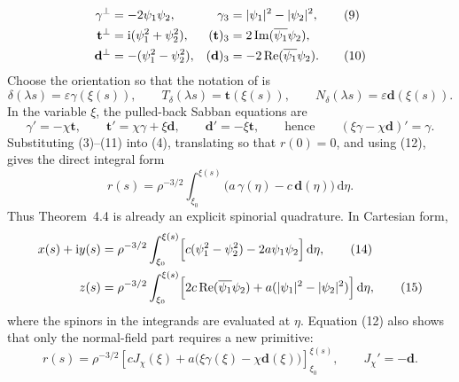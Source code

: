 \documentclass[11pt]{article}
\newcommand{\ii}{\mathrm i}
\newcommand{\dd}{\,\mathrm d}
\newcommand{\Rea}{\operatorname{Re}}
\newcommand{\Ima}{\operatorname{Im}}
\newcommand{\br}[3]{\left[#1\right]_{#2}^{#3}}
\begin{document}
\begin{align}
 \gamma^\perp&=-2\psi_1\psi_2,& \gamma_3&=|\psi_1|^2-|\psi_2|^2, \tag{9}\\
 \mathbf t^\perp&=\ii(\psi_1^2+\psi_2^2),& (\mathbf t)_3&=2\Ima(\overline{\psi_1}\psi_2), \notag\\
 \mathbf d^\perp&=-(\psi_1^2-\psi_2^2),& (\mathbf d)_3&=-2\Rea(\overline{\psi_1}\psi_2). \tag{10}
\end{align}
Choose the orientation so that the notation of \cite{LucasOrtega2026} is
\begin{equation}
 \delta(\lambda s)=\varepsilon\gamma(\xi(s)),\qquad
 T_\delta(\lambda s)=\mathbf t(\xi(s)),\qquad
 N_\delta(\lambda s)=\varepsilon\mathbf d(\xi(s)). \tag{11}
\end{equation}
In the variable \(\xi\), the pulled-back Sabban equations are
\begin{equation}
 \gamma'=-\chi\mathbf t,\qquad
 \mathbf t'=\chi\gamma+\xi\mathbf d,\qquad
 \mathbf d'=-\xi\mathbf t,
 \qquad\text{hence}\qquad (\xi\gamma-\chi\mathbf d)'=\gamma. \tag{12}
\end{equation}
Substituting (3)--(11) into (4), translating so that \(r(0)=0\), and using (12), gives the direct integral form
\begin{equation}
 \boxed{\displaystyle
 r(s)=\rho^{-3/2}\int_{\xi_0}^{\xi(s)}\bigl(a\,\gamma(\eta)-c\,\mathbf d(\eta)\bigr)\dd\eta.} \tag{13}
\end{equation}
Thus Theorem~4.4 is already an explicit spinorial quadrature. In Cartesian form,
\begin{align}
 x(s)+\ii y(s)
 &=\rho^{-3/2}\int_{\xi_0}^{\xi(s)}
 \Bigl[c(\psi_1^2-\psi_2^2)-2a\psi_1\psi_2\Bigr]\dd\eta, \tag{14}\\
 z(s)
 &=\rho^{-3/2}\int_{\xi_0}^{\xi(s)}
 \Bigl[2c\Rea(\overline{\psi_1}\psi_2)+a(|\psi_1|^2-|\psi_2|^2)\Bigr]\dd\eta, \tag{15}
\end{align}
where the spinors in the integrands are evaluated at \(\eta\). Equation (12) also shows that only the normal-field part requires a new primitive:
\begin{equation}
 r(s)=\rho^{-3/2}\br{cJ_\chi(\xi)+a\bigl(\xi\gamma(\xi)-\chi\mathbf d(\xi)\bigr)}{\xi_0}{\xi(s)},
 \qquad J_\chi'=-\mathbf d. \tag{16}
\end{equation}
\end{document}
